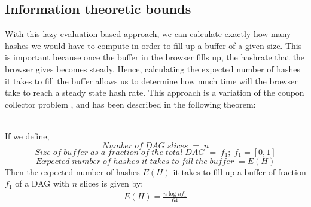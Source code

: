 \documentclass[runningheads]{llncs}
\begin{document}
\subsection{Information theoretic bounds}
With this lazy-evaluation based approach, we can calculate exactly how many hashes we would have to compute in order to fill up a buffer of a given size. This is important because once the buffer in the browser fills up, the hashrate that the browser gives becomes steady. Hence, calculating the expected number of hashes it takes to fill the buffer allows us to determine how much time will the browser take to reach a steady state hash rate. This approach is a variation of the coupon collector problem \cite{couponCollector}, and has been described in the following theorem: 
\begin{theorem}
\label{expectedHashes}\\
If we define,
    \[Number\;of\;DAG\;slices\;=\;n\]
    \[Size\;of\;buffer\;as\;a\;fraction\;of\;the\;total\;DAG\;=\;f_1;\;f_1=[0,1] \]
    \[Expected\;number\;of\;hashes\;it\;takes\;to\;fill\;the\;buffer\;= E(H)\]
Then the expected number of hashes $E(H)$ it takes to fill up a buffer of fraction $f_1$ of a DAG with $n$ slices is given by:
\begin{gather}
E(H) = \frac{n\log{nf_1}}{64}
\end{gather}
\end{theorem}
\end{document}
